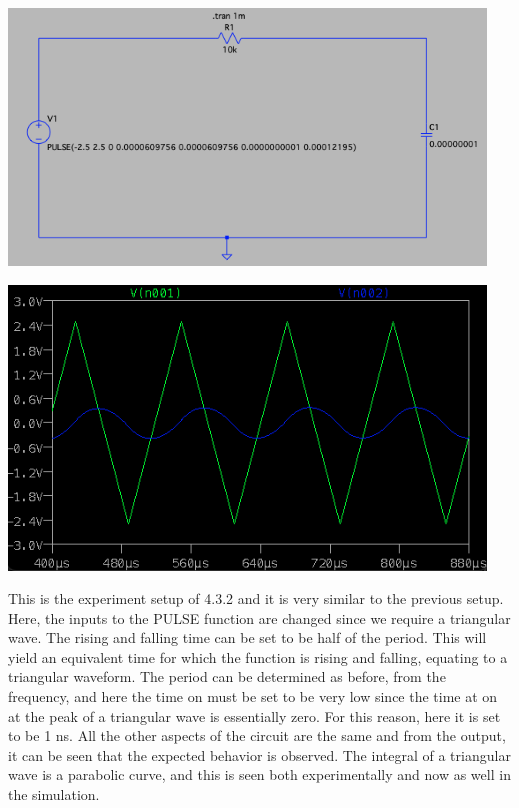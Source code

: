 \documentclass[12pt]{article}
\newcommand{\objects}[2]{%
  \leavevmode\vbox{\hbox{#1}\nointerlineskip\hbox{#2}}%
}
\begin{document}
    \newpage
    \begin{center}
        \objects
            {\includegraphics[width=0.95\textwidth]{4.3.2 LTSpice Circuit.png}}
            \:
            {\includegraphics[width=0.95\textwidth]{4.3.2 LTSpice Output.png}}
    \end{center}
    \par This is the experiment setup of 4.3.2 and it is very similar to the previous setup. Here, the inputs to the PULSE function are changed since we require a triangular wave. The rising and falling time can be set to be half of the period. This will yield an equivalent time for which the function is rising and falling, equating to a triangular waveform. The period can be determined as before, from the frequency, and here the time on must be set to be very low since the time at on at the peak of a triangular wave is essentially zero. For this reason, here it is set to be 1 ns. All the other aspects of the circuit are the same and from the output, it can be seen that the expected behavior is observed. The integral of a triangular wave is a parabolic curve, and this is seen both experimentally and now as well in the simulation.
    \newpage
\end{document}
